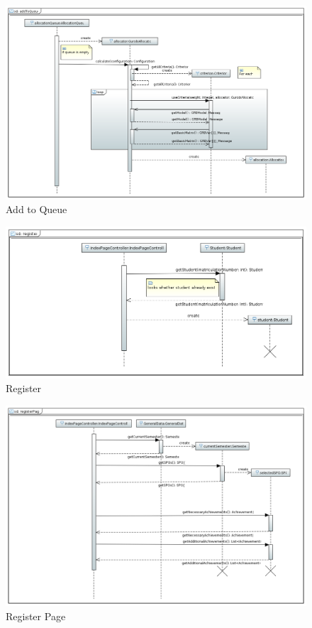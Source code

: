 \documentclass[parskip=full]{scrartcl}
\begin{document}
\begin{figure}
\centering
\includegraphics[width=\linewidth]{bilder/seqaddToQueue.png}
\caption{Add to Queue}
\label{seq:addToQueue}
\end{figure}

\begin{figure}
\centering
\includegraphics[width=\linewidth]{bilder/seqregister.png}
\caption{Register}
\label{seq:register}
\end{figure}

\begin{figure}
\centering
\includegraphics[width=\linewidth]{bilder/seqregisterPage.png}
\caption{Register Page}
\label{seq:registerPage}
\end{figure}
\end{document}
